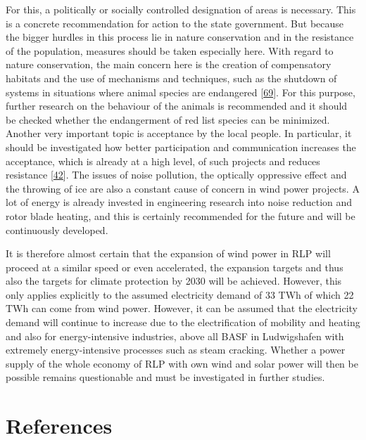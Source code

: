 \documentclass[a4paper,11pt]{article}
\begin{document}
For this, a politically or socially controlled designation of areas is necessary. This is a concrete recommendation for action to the state government. But because the bigger hurdles in this process lie in nature conservation and in the resistance of the population, measures should be taken especially here. With regard to nature conservation, the main concern here is the creation of compensatory habitats and the use of mechanisms and techniques, such as the shutdown of systems in situations where animal species are endangered {[}\protect\hyperlink{ref-BUNDux5cux26Nabu.2017}{69}{]}. For this purpose, further research on the behaviour of the animals is recommended and it should be checked whether the endangerment of red list species can be minimized. Another very important topic is acceptance by the local people. In particular, it should be investigated how better participation and communication increases the acceptance, which is already at a high level, of such projects and reduces resistance {[}\protect\hyperlink{ref-FachagenturWindenergieanLand.2020}{42}{]}. The issues of noise pollution, the optically oppressive effect and the throwing of ice are also a constant cause of concern in wind power projects. A lot of energy is already invested in engineering research into noise reduction and rotor blade heating, and this is certainly recommended for the future and will be continuously developed.

It is therefore almost certain that the expansion of wind power in RLP will proceed at a similar speed or even accelerated, the expansion targets and thus also the targets for climate protection by 2030 will be achieved. However, this only applies explicitly to the assumed electricity demand of 33 TWh of which 22 TWh can come from wind power. However, it can be assumed that the electricity demand will continue to increase due to the electrification of mobility and heating and also for energy-intensive industries, above all BASF in Ludwigshafen with extremely energy-intensive processes such as steam cracking. Whether a power supply of the whole economy of RLP with own wind and solar power will then be possible remains questionable and must be investigated in further studies.

\newpage

\hypertarget{references}{%
\section*{References}\label{references}}
\end{document}
